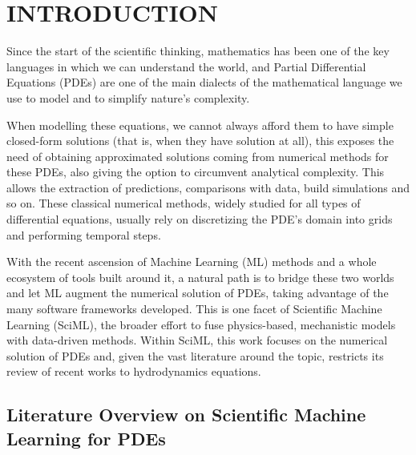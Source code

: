 \chapter{INTRODUCTION}
\label{chap:intro}




Since the start of the scientific thinking, mathematics has been one of the key languages in which we can understand the world, and Partial Differential Equations (PDEs) are one of the main dialects of the mathematical language we use to model and to simplify nature's complexity.

When modelling these equations, we cannot always afford them to have simple closed-form solutions (that is, when they have solution at all), this exposes the need of obtaining approximated solutions coming from numerical methods for these PDEs, also giving the option to circumvent analytical complexity. This allows the extraction of predictions, comparisons with data, build simulations and so on. These classical numerical methods, widely studied for all types of differential equations, usually rely on discretizing the PDE's domain into grids and performing temporal steps.

With the recent ascension of Machine Learning (ML) methods and a whole ecosystem of tools built around it, a natural path is to bridge these two worlds and let ML augment the numerical solution of PDEs, taking advantage of the many software frameworks developed. This is one facet of Scientific Machine Learning (SciML), the broader effort to fuse physics-based, mechanistic models with data-driven methods. Within SciML, this work focuses on the numerical solution of PDEs and, given the vast literature around the topic, restricts its review of recent works to hydrodynamics equations.

\section{Literature Overview on Scientific Machine Learning for PDEs}


